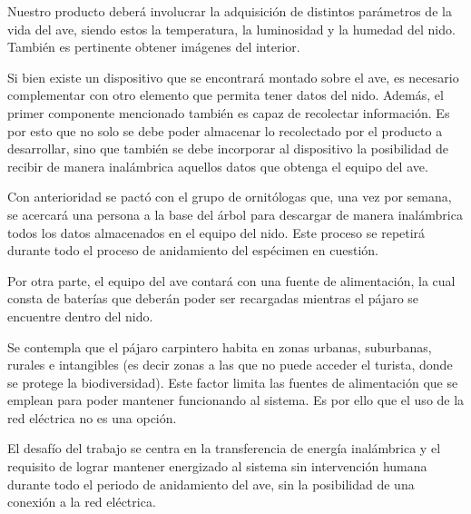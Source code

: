 



Nuestro producto deberá involucrar la adquisición de distintos parámetros de la vida del ave, siendo estos la temperatura, la luminosidad y la humedad del nido. También es pertinente obtener imágenes del interior. 

Si bien existe un dispositivo que se encontrará montado sobre el ave, es necesario complementar con otro elemento que permita tener datos del nido. Además, el primer componente mencionado también es capaz de recolectar información. Es por esto que no solo se debe poder almacenar lo recolectado por el producto a desarrollar, sino que también se debe incorporar al dispositivo la posibilidad de recibir de manera inalámbrica aquellos datos que obtenga el equipo del ave. 

Con anterioridad se pactó con el grupo de ornitólogas que, una vez por semana, se acercará una persona a la base del árbol para descargar de manera inalámbrica todos los datos almacenados en el equipo del nido. Este proceso se repetirá durante todo el proceso de anidamiento del espécimen en cuestión.

Por otra parte, el equipo del ave contará con una fuente de alimentación, la cual consta de baterías que deberán poder ser recargadas mientras el pájaro se encuentre dentro del nido.

Se contempla que el pájaro carpintero habita en zonas urbanas, suburbanas, rurales e intangibles (es decir zonas a las que no puede acceder el turista, donde se protege la biodiversidad). Este factor limita las fuentes de alimentación que se emplean para poder mantener funcionando al sistema. Es por ello que el uso de la red eléctrica no es una opción.

El desafío del trabajo se centra en la  transferencia de energía inalámbrica y el requisito de lograr mantener energizado al sistema sin intervención humana durante todo el periodo de anidamiento del ave, sin la posibilidad de una conexión a la red eléctrica.
